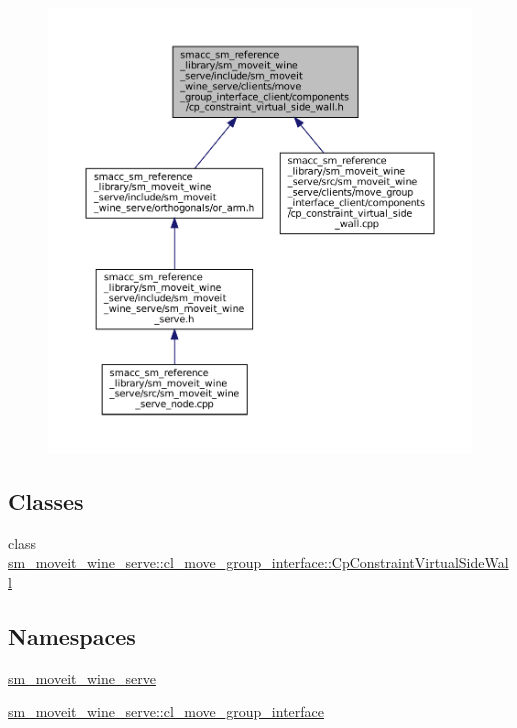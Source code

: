 \begin{figure}[H]
\begin{center}
\leavevmode
\includegraphics[width=350pt]{sm__moveit__wine__serve_2include_2sm__moveit__wine__serve_2clients_2move__group__interface__cliec97128d41f34451b733e409e17fdef28}
\end{center}
\end{figure}
\subsection*{Classes}
\begin{DoxyCompactItemize}
\item 
class \hyperlink{classsm__moveit__wine__serve_1_1cl__move__group__interface_1_1CpConstraintVirtualSideWall}{sm\+\_\+moveit\+\_\+wine\+\_\+serve\+::cl\+\_\+move\+\_\+group\+\_\+interface\+::\+Cp\+Constraint\+Virtual\+Side\+Wall}
\end{DoxyCompactItemize}
\subsection*{Namespaces}
\begin{DoxyCompactItemize}
\item 
 \hyperlink{namespacesm__moveit__wine__serve}{sm\+\_\+moveit\+\_\+wine\+\_\+serve}
\item 
 \hyperlink{namespacesm__moveit__wine__serve_1_1cl__move__group__interface}{sm\+\_\+moveit\+\_\+wine\+\_\+serve\+::cl\+\_\+move\+\_\+group\+\_\+interface}
\end{DoxyCompactItemize}
